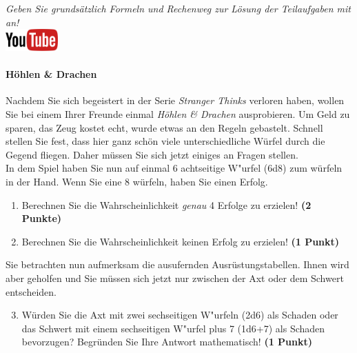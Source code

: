 \documentclass[a4paper, 9pt]{scrartcl}\usepackage[]{graphicx}\usepackage[]{xcolor}
\begin{document}
\textit{Geben Sie grunds{\"a}tzlich Formeln und Rechenweg zur L{\"o}sung der
  Teilaufgaben mit an!} \\[1Ex]

\hfill\href{https://youtu.be/8Pb2sKUIMyk}{\includegraphics[width =
  2cm]{img/youtube}} %
\hspace{2Ex}

\paragraph{H{\"o}hlen \& Drachen}



Nachdem Sie sich begeistert in der Serie \textit{Stranger Thinks} verloren
haben, wollen Sie bei einem Ihrer Freunde einmal \textit{H{\"o}hlen \& Drachen}
ausprobieren. Um Geld zu sparen, das Zeug kostet echt, wurde etwas an den
Regeln gebastelt. Schnell stellen Sie fest, dass hier ganz sch{\"o}n viele
unterschiedliche W{\"u}rfel durch die Gegend fliegen. Daher m{\"u}ssen Sie sich
jetzt einiges an Fragen stellen. \\%

In dem Spiel haben Sie nun auf einmal 6 achtseitige W{"u}rfel (6d8) zum w{\"u}rfeln in der Hand. Wenn Sie eine 8 w{\"u}rfeln,
haben Sie einen Erfolg.

\begin{enumerate}
\item Berechnen Sie die Wahrscheinlichkeit \textit{genau}
  4 Erfolge zu erzielen!  \textbf{(2 Punkte)}
\item Berechnen Sie die Wahrscheinlichkeit keinen Erfolg zu erzielen!
  \textbf{(1 Punkt)}
\end{enumerate}

Sie betrachten nun aufmerksam die ausufernden Ausr{\"u}stungstabellen. Ihnen
wird aber geholfen und Sie m{\"u}ssen sich jetzt nur zwischen der Axt oder dem
Schwert entscheiden.

\begin{enumerate}
  \setcounter{enumi}{2}
\item W{\"u}rden Sie die Axt mit zwei sechseitigen W{"u}rfeln (2d6) als Schaden oder
  das Schwert mit einem sechseitigen W{"u}rfel plus 7 (1d6+7) als Schaden bevorzugen?
  Begr{\"u}nden Sie Ihre Antwort mathematisch! \textbf{(1 Punkt)}
\end{enumerate}
\end{document}
